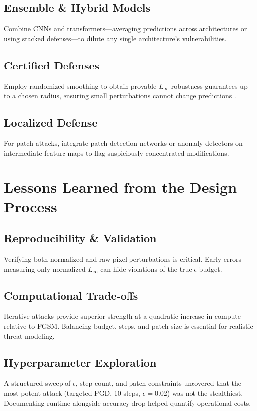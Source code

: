 \documentclass[twoside,11pt]{article}
\begin{document}
\subsection{Ensemble \& Hybrid Models}
Combine CNNs and transformers—averaging predictions across architectures or using stacked defenses—to dilute any single architecture’s vulnerabilities.

\subsection{Certified Defenses}
Employ randomized smoothing to obtain provable $L_\infty$ robustness guarantees up to a chosen radius, ensuring small perturbations cannot change predictions \citep{cohen2019certified}.

\subsection{Localized Defense}
For patch attacks, integrate patch detection networks or anomaly detectors on intermediate feature maps to flag suspiciously concentrated modifications.

\section{Lessons Learned from the Design Process}

\subsection{Reproducibility \& Validation}
Verifying both normalized and raw‐pixel perturbations is critical. Early errors measuring only normalized $L_\infty$ can hide violations of the true $\epsilon$ budget.

\subsection{Computational Trade‑offs}
Iterative attacks provide superior strength at a quadratic increase in compute relative to FGSM. Balancing budget, steps, and patch size is essential for realistic threat modeling.

\subsection{Hyperparameter Exploration}
A structured sweep of $\epsilon$, step count, and patch constraints uncovered that the most potent attack (targeted PGD, 10 steps, $\epsilon=0.02$) was not the stealthiest. Documenting runtime alongside accuracy drop helped quantify operational costs.
\end{document}

